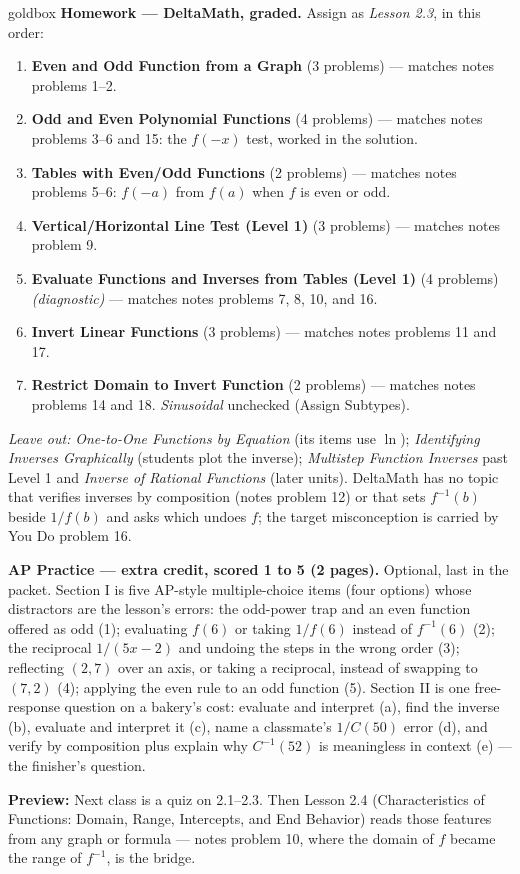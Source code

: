 \documentclass[10pt]{article}
\begin{document}
\begin{skillbox}{goldbox}
\textbf{Homework --- DeltaMath, graded.} Assign as \textit{Lesson 2.3}, in this order:
\begin{enumerate}[itemsep=1pt,topsep=2pt]
  \item \textbf{Even and Odd Function from a Graph} (3 problems) --- matches notes problems
        1--2.
  \item \textbf{Odd and Even Polynomial Functions} (4 problems) --- matches notes problems
        3--6 and 15: the $f(-x)$ test, worked in the solution.
  \item \textbf{Tables with Even/Odd Functions} (2 problems) --- matches notes problems 5--6:
        $f(-a)$ from $f(a)$ when $f$ is even or odd.
  \item \textbf{Vertical/Horizontal Line Test (Level 1)} (3 problems) --- matches notes
        problem 9.
  \item \textbf{Evaluate Functions and Inverses from Tables (Level 1)} (4 problems)
        \textit{(diagnostic)} --- matches notes problems 7, 8, 10, and 16.
  \item \textbf{Invert Linear Functions} (3 problems) --- matches notes problems 11 and 17.
  \item \textbf{Restrict Domain to Invert Function} (2 problems) --- matches notes problems 14
        and 18. \textit{Sinusoidal} unchecked (Assign Subtypes).
\end{enumerate}
\textit{Leave out:} \textit{One-to-One Functions by Equation} (its items use $\ln$);
\textit{Identifying Inverses Graphically} (students plot the inverse); \textit{Multistep
Function Inverses} past Level 1 and \textit{Inverse of Rational Functions} (later units).
DeltaMath has no topic that verifies inverses by composition (notes problem 12) or that sets
$f^{-1}(b)$ beside $1/f(b)$ and asks which undoes $f$; the target misconception is carried by
You Do problem 16.

\textbf{AP Practice --- extra credit, scored 1 to 5 (2 pages).} Optional, last in the packet.
Section I is five AP-style multiple-choice items (four options) whose distractors are the
lesson's errors: the odd-power trap and an even function offered as odd (1); evaluating
$f(6)$ or taking $1/f(6)$ instead of $f^{-1}(6)$ (2); the reciprocal $1/(5x - 2)$ and undoing
the steps in the wrong order (3); reflecting $(2, 7)$ over an axis, or taking a reciprocal,
instead of swapping to $(7, 2)$ (4); applying the even rule to an odd function (5). Section II
is one free-response question on a bakery's cost: evaluate and interpret (a), find the inverse
(b), evaluate and interpret it (c), name a classmate's $1/C(50)$ error (d), and verify by
composition plus explain why $C^{-1}(52)$ is meaningless in context (e) --- the finisher's
question.

\textbf{Preview:} Next class is a quiz on 2.1--2.3. Then Lesson 2.4 (Characteristics of
Functions: Domain, Range, Intercepts, and End Behavior) reads those features from any graph or
formula --- notes problem 10, where the domain of $f$ became the range of $f^{-1}$, is the
bridge.
\end{skillbox}
\end{document}

